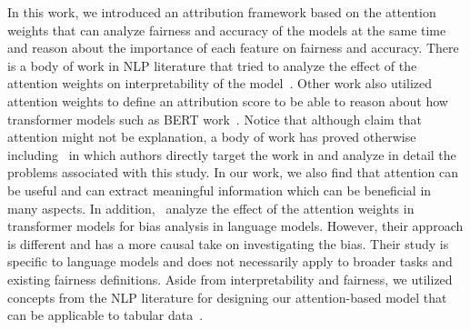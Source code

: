  In this work, we introduced an attribution framework based on the attention weights that can analyze fairness and accuracy of the models at the same time and reason about the importance of each feature on fairness and accuracy. There is a body of work in NLP literature that tried to analyze the effect of the attention weights on interpretability of the model~\cite{wiegreffe-pinter-2019-attention,jain-wallace-2019-attention,serrano-smith-2019-attention}. Other work also utilized attention weights to define an attribution score to be able to reason about how transformer models such as BERT work~\cite{hao2021self}. Notice that although \citet{jain-wallace-2019-attention} claim that attention might not be explanation, a body of work has proved otherwise including~\cite{wiegreffe-pinter-2019-attention} in which authors directly target the work in \citet{jain-wallace-2019-attention} and analyze in detail the problems associated with this study. In our work, we also find that attention can be useful and can extract meaningful information which can be beneficial in many aspects. In addition,~\citet{NEURIPS2020_92650b2e} analyze the effect of the attention weights in transformer models for bias analysis in language models. However, their approach is different and has a more causal take on investigating the bias. Their study is specific to language models and does not necessarily apply to broader tasks and existing fairness definitions. Aside from interpretability and fairness, we utilized concepts from the NLP literature for designing our attention-based model that can be applicable to tabular data~\cite{NIPS2017_3f5ee243,zhou-etal-2016-attention}.
 